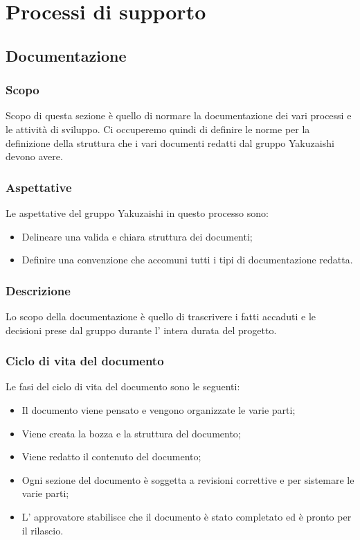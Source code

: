 \section{Processi di supporto}\label{section:processi_supporto}
\subsection{Documentazione}\label{subsection: documentazione}
\subsubsection{Scopo}\label{subsubsection: scopo}
Scopo di questa sezione è quello di normare la documentazione dei vari processi e le attività di sviluppo.
Ci occuperemo quindi di definire le norme per la definizione della struttura che i vari documenti redatti dal gruppo Yakuzaishi devono avere.
\subsubsection{Aspettative}
Le aspettative del gruppo Yakuzaishi in questo processo sono:
\begin{itemize}
    \item Delineare una valida e chiara struttura dei documenti;
    \item Definire una convenzione che accomuni tutti i tipi di documentazione redatta.
 \end {itemize}
\subsubsection{Descrizione}
Lo scopo della documentazione è quello di trascrivere i fatti accaduti e le decisioni prese dal gruppo durante l' intera durata del progetto.
\subsubsection{Ciclo di vita del documento}
Le fasi del ciclo di vita del documento sono le seguenti:
\begin {itemize}
    \item Il documento viene pensato e vengono organizzate le varie parti;
    \item Viene creata la bozza e la struttura del documento;
    \item Viene redatto il contenuto del documento;
    \item Ogni sezione del documento è soggetta a revisioni correttive e per sistemare le varie parti;
    \item L' approvatore stabilisce che il documento è stato completato ed è pronto per il rilascio.
\end{itemize}
